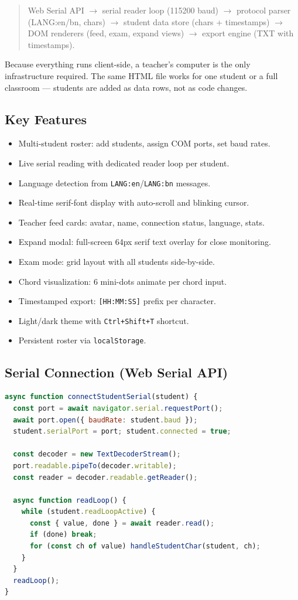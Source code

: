 \documentclass[11pt,a4paper,twoside]{article}
\begin{document}
\begin{quote}\small
Web Serial API $\rightarrow$ serial reader loop (115200 baud) $\rightarrow$
protocol parser (LANG:en/bn, chars) $\rightarrow$ student data store
(chars + timestamps) $\rightarrow$ DOM renderers (feed, exam, expand
views) $\rightarrow$ export engine (TXT with timestamps).
\end{quote}

Because everything runs client-side, a teacher's computer is the only
infrastructure required. The same HTML file works for one student or a
full classroom --- students are added as data rows, not as code changes.

\subsection{Key Features}
\begin{itemize}[nosep]
  \item Multi-student roster: add students, assign COM ports, set baud rates.
  \item Live serial reading with dedicated reader loop per student.
  \item Language detection from \texttt{LANG:en}/\texttt{LANG:bn} messages.
  \item Real-time serif-font display with auto-scroll and blinking cursor.
  \item Teacher feed cards: avatar, name, connection status, language, stats.
  \item Expand modal: full-screen 64px serif text overlay for close monitoring.
  \item Exam mode: grid layout with all students side-by-side.
  \item Chord visualization: 6 mini-dots animate per chord input.
  \item Timestamped export: \texttt{[HH:MM:SS]} prefix per character.
  \item Light/dark theme with \texttt{Ctrl+Shift+T} shortcut.
  \item Persistent roster via \texttt{localStorage}.
\end{itemize}

\subsection{Serial Connection (Web Serial API)}
\begin{lstlisting}[language=JavaScript,caption=Connecting to a BrailleBridge device.]
async function connectStudentSerial(student) {
  const port = await navigator.serial.requestPort();
  await port.open({ baudRate: student.baud });
  student.serialPort = port; student.connected = true;

  const decoder = new TextDecoderStream();
  port.readable.pipeTo(decoder.writable);
  const reader = decoder.readable.getReader();

  async function readLoop() {
    while (student.readLoopActive) {
      const { value, done } = await reader.read();
      if (done) break;
      for (const ch of value) handleStudentChar(student, ch);
    }
  }
  readLoop();
}
\end{lstlisting}
\end{document}
